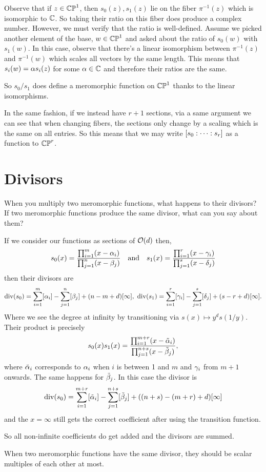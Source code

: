 \documentclass[12pt]{memoir}
\begin{document}
\begin{ptcbr}
    Observe that if $z\in\mathbb{CP}^1$, then $s_0(z),s_1(z)$ lie on the fiber $\pi^{-1}(z)$ which is isomorphic to $\mathbb{C}$. So taking their ratio on this fiber does produce a complex number. However, we must verify that the ratio is well-defined. Assume we picked another element of the base, $w\in\mathbb{CP}^1$ and asked about the ratio of $s_0(w)$ with $s_1(w)$. In this case, observe that there's a linear isomorphism between $\pi^{-1}(z)$ and $\pi^{-1}(w)$ which scales all vectors by the same length. This means that $s_i(w)=\alpha s_i(z)$ for some $\alpha\in\mathbb{C}$ and therefore their ratios are the same.\par
    So $s_0/s_1$ does define a meromorphic function on $\mathbb{CP}^1$ thanks to the linear isomorphisms.\par
    In the same fashion, if we instead have $r+1$ sections, via a same argument we can see that when changing fibers, the sections only change by a scaling which is the same on all entries. So this means that we may write $\left\lbrack s_0:\dots:s_r\right\rbrack$ as a function to $\mathbb{CP}^r$.
\end{ptcbr}

\section{Divisors}

\begin{Ej}
    When you multiply two meromorphic functions, what happens to their divisors? If two meromorphic functions produce the same divisor, what can you say about them?
\end{Ej}

\begin{ptcbr}
    If we consider our functions as sections of $\mathcal{O}(d)$ then,
    $$\displaystyle s_0(x)=\frac{\prod_{i=1}^{m}(x-\alpha_i)}{\prod_{j=1}^{n}(x-\beta_j)}\quad\text{and}\quad s_1(x)=\frac{\prod_{i=1}^{r}(x-\gamma_i)}{\prod_{j=1}^{s}(x-\delta_j)}$$
    then their divisors are 
    $$\div(s_0)=\sum_{i=1}^{m}[\al_i]-\sum_{j=1}^{n}[\bt_j]+(n-m+d)[\infty],\ \div(s_1)=\sum_{i=1}^{r}[\ga_i]-\sum_{j=1}^{s}[\dl_j]+(s-r+d)[\infty].$$
    Where we see the degree at infinity by transitioning via $s(x)\mapsto y^ds(1/y)$.
    Their product is precisely 
    $$s_0(x)s_1(x)=\frac{\prod_{i=1}^{m+r}(x-\tilde{\alpha}_i)}{\prod_{j=1}^{n+s}(x-\tilde{\beta}_j)},$$
    where $\tilde{\alpha}_i$ corresponds to $\alpha_i$ when $i$ is between 1 and $m$ and $\gamma_i$ from $m+1$ onwards. The same happens for $\tilde{\beta}_j$. In this case the divisor is 
    $$\operatorname{div}(s_0)=\sum_{i=1}^{m+r}[\tilde{\alpha}_i]-\sum_{j=1}^{n+s}[\tilde{\beta}_j]+((n+s)-(m+r)+d)[\infty]$$
    and the $x=\infty$ still gets the correct coefficient after using the transition function. \par
    So all non-infinite coefficients do get added and the divisors are summed.\par
    When two meromorphic functions have the same divisor, they should be scalar multiples of each other at most. 
\end{ptcbr}
\end{document}
